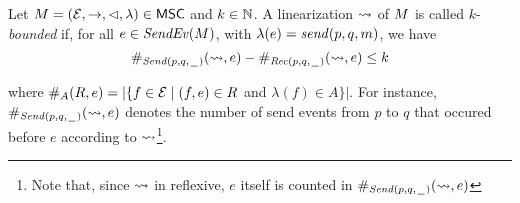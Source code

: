 \begin{definition}\label{def:lin_k_bounded}
	Let $\msc = (\Events,\procrel,\lhd,\lambda) \in \MSCs$ and $k \in \N$.
	A linearization $\linrel$ of $\msc$ is called
	$k$-\emph{bounded} if, for all $e \in \SendEv{\msc}$, with $\lambda(e) = \sact{p}{q}{\msg}$, we have
	\[
	\sametype{e}{\pqsAct{p}{q}}{\linrel} - \sametype{e}{\pqrAct{p}{q}}{\linrel} \le k
	\]
\end{definition}
\noindent where $\sametype{e}{A}{\rel} = |\{f \in \Events \mid (f,e) \in \rel$ and $\lambda(f) \in A\}|$.
For instance, $\sametype{e}{\pqsAct{p}{q}}{\linrel}$ denotes the number of send events from $p$ to $q$ that occured before $e$ according to $\linrel$\footnote{Note that, since $\linrel$ in reflexive, $e$ itself is counted in $\sametype{e}{\pqsAct{p}{q}}{\linrel}$}.

